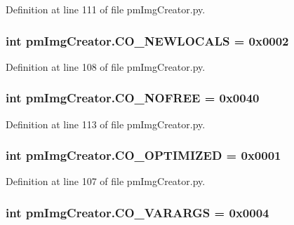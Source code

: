 Definition at line 111 of file pm\-Img\-Creator.\-py.

\hypertarget{namespacepm_img_creator_a9f9b9cb90243369e338d1d70ee6efe48}{
\subsubsection[{C\-O\-\_\-\-N\-E\-W\-L\-O\-C\-A\-L\-S}]{\setlength{\rightskip}{0pt plus 5cm}int pm\-Img\-Creator.\-C\-O\-\_\-\-N\-E\-W\-L\-O\-C\-A\-L\-S = 0x0002}}\label{namespacepm_img_creator_a9f9b9cb90243369e338d1d70ee6efe48}


Definition at line 108 of file pm\-Img\-Creator.\-py.

\hypertarget{namespacepm_img_creator_a162149265a5edb76c4943a2a1a9c1d6e}{
\subsubsection[{C\-O\-\_\-\-N\-O\-F\-R\-E\-E}]{\setlength{\rightskip}{0pt plus 5cm}int pm\-Img\-Creator.\-C\-O\-\_\-\-N\-O\-F\-R\-E\-E = 0x0040}}\label{namespacepm_img_creator_a162149265a5edb76c4943a2a1a9c1d6e}


Definition at line 113 of file pm\-Img\-Creator.\-py.

\hypertarget{namespacepm_img_creator_a3cb1b10faf2e86f72fa24afebc408ebe}{
\subsubsection[{C\-O\-\_\-\-O\-P\-T\-I\-M\-I\-Z\-E\-D}]{\setlength{\rightskip}{0pt plus 5cm}int pm\-Img\-Creator.\-C\-O\-\_\-\-O\-P\-T\-I\-M\-I\-Z\-E\-D = 0x0001}}\label{namespacepm_img_creator_a3cb1b10faf2e86f72fa24afebc408ebe}


Definition at line 107 of file pm\-Img\-Creator.\-py.

\hypertarget{namespacepm_img_creator_a7c50412765e7161b84876069e848f9bd}{
\subsubsection[{C\-O\-\_\-\-V\-A\-R\-A\-R\-G\-S}]{\setlength{\rightskip}{0pt plus 5cm}int pm\-Img\-Creator.\-C\-O\-\_\-\-V\-A\-R\-A\-R\-G\-S = 0x0004}}\label{namespacepm_img_creator_a7c50412765e7161b84876069e848f9bd}



